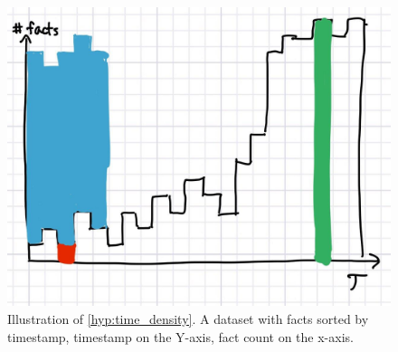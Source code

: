 \begin{figure}[ht]
\centering
\begin{minipage}{0.95\columnwidth}
\centering
\small
\includegraphics[scale=0.18]{content/hypotheses/figures/time_density.jpg}
\caption{Illustration of \autoref{hyp:time_density}. A dataset with facts sorted by timestamp, timestamp on the Y-axis, fact count on the x-axis.
}
\label{fig:time_representation}
\end{minipage}
\end{figure}
